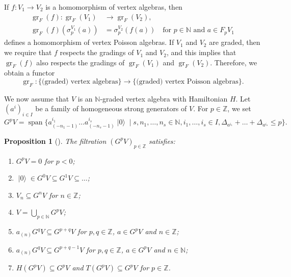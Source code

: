\documentclass[a4paper, 12pt, reqno]{amsart}
\newtheorem{proposition}[theorem]{Proposition}
\theoremstyle{remark}
\DeclareMathOperator{\gr}{gr}
\DeclareMathOperator{\vspan}{span}
\DeclareMathOperator{\vac}{|0\rangle}
\begin{document}
If $f: V_1 \to V_2$ is a homomorphism of vertex algebras, then
\begin{align*}
  \gr_F(f): \gr_F(V_1) &\to \gr_F(V_2), \\
  \gr_F(f)(\sigma^{V_1}_p(a)) &= \sigma^{V_2}_p(f(a)) \quad \text{for $p \in \mathbb{N}$ and $a \in F_pV_1$}
\end{align*}
defines a homomorphism of vertex Poisson algebras.
If $V_1$ and $V_2$ are graded, then we require that $f$ respects the gradings of $V_1$ and $V_2$, and this implies that $\gr_F(f)$ also respects the gradings of $\gr_F(V_1)$ and $\gr_F(V_2)$.
Therefore, we obtain a functor
\begin{equation*}
  \gr_F: \{\text{(graded) vertex algebras}\} \to \{\text{(graded) vertex Poisson algebras}\}.
\end{equation*}

We now assume that $V$ is an $\mathbb{N}$-graded vertex algebra with Hamiltonian $H$.
Let $(a^i)_{i \in I}$ be a family of homogeneous strong generators of $V$.
For $p \in \mathbb{Z}$, we set
\begin{equation*}
  G^pV = \vspan\{a^{i_1}_{(-n_1 - 1)}\dots a^{i_s}_{(-n_s - 1)}\vac \mid s, n_1, \dots, n_s \in \mathbb{N}, i_1, \dots, i_s \in I, \Delta_{a^{i_1}} + \dots + \Delta_{a^{i_s}} \le p\}.
\end{equation*}

\begin{proposition}[{\cite{li_vertex_2004}}]
  \label{prp:14}
  The filtration $(G^pV)_{p \in \mathbb{Z}}$ satisfies:
  \begin{enumerate}
  \item $G^pV = 0$ for $p < 0$;
  \item $\vac \in G^0V \subseteq G^1V \subseteq \dots$;
  \item $V_n \subseteq G^nV$ for $n \in \mathbb{Z}$;
  \item $V = \bigcup_{p \in \mathbb{N}}G^pV$;
  \item $a_{(n)}G^qV \subseteq G^{p + q}V$ for $p, q \in \mathbb{Z}$, $a \in G^pV$ and $n \in \mathbb{Z}$;
  \item $a_{(n)}G^qV \subseteq G^{p + q - 1}V$ for $p, q \in \mathbb{Z}$, $a \in G^pV$ and $n \in \mathbb{N}$;
  \item $H(G^pV) \subseteq G^pV$ and $T(G^pV) \subseteq G^pV$ for $p \in \mathbb{Z}$.
  \end{enumerate}
\end{proposition}
\end{document}
